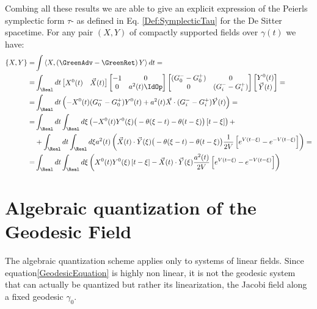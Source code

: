 \documentclass[Main]{subfiles}
\begin{document}
			Combing all these results we are able to give an explicit expression of the Peierls symplectic form $\tau$- as defined in Eq. 	\ref{Def:SymplecticTau} for the De Sitter spacetime.
			For any pair $(X, Y)$ of compactly supported fields over $\gamma(t)$ we have:
			\begin{align*}
			\{X ,Y \} =&\int \left\langle X, \left(\GreenAdv - \GreenRet \right)Y \right\rangle dt =	\\
			=&
			\int_\Real dt  
				 \begin{bmatrix}  
					 X^0(t) & \vec{X}(t) \\
				 \end{bmatrix}
				 \begin{bmatrix}  
				 	-1 & 0 \\
				 	0 & a^2(t)\IdOp
				 \end{bmatrix}			
				 \begin{bmatrix}  
				 	(G^-_0 - G^+_0) & 0 \\
				 	0 & (G^-_i - G^+_i)
				 \end{bmatrix}	
				 \begin{bmatrix}  
				 	Y^0(t) \\ \vec{Y}(t)
				 \end{bmatrix}	
				 = \\
			=&
				\int_\Real dt  \left(
					-X^0(t) (G^-_0 - G^+_0)Y^0(t)+
					a^2(t)\vec{X} \cdot (G^-_i- G^+_i)\vec{Y}(t)
				\right) = \\
			=&
				\int_\Real dt 				\int_\Real d\xi \left(
					-X^0(t)Y^0(\xi)\big(-\theta(\xi -t)-\theta(t-\xi )\big)\left[t-\xi \right] \right) +\\
			&+
					\int_\Real dt 				\int_\Real d\xi a^2(t) \left(
					\vec{X}(t) \cdot \vec{Y}(\xi)
						\big(-\theta(\xi -t)-\theta(t-\xi )\big) \frac{1}{2V}\left[ e^{V(t-\xi)} - e^{-V(t-\xi)}\right]
					\right) = \\
			=& \int_\Real dt 				\int_\Real d\xi \left(
				X^0(t)Y^0(\xi)\left[t-\xi \right]				-
				\vec{X}(t) \cdot \vec{Y}(\xi) \frac{a^2(t)}{2V}\left[ e^{V(t-\xi)} - e^{-V(t-\xi)}\right]
				\right)
			\end{align*}					
		

\section{Algebraic quantization of the Geodesic Field}
	The algebraic quantization scheme applies only to %
	systems of linear fields.
	Since equation\ref{GeodesicEquation} is highly non linear,  it is not the geodesic system that can actually be quantized but rather its linearization, the Jacobi field along a fixed geodesic $\gamma_0$.
	
\end{document}
